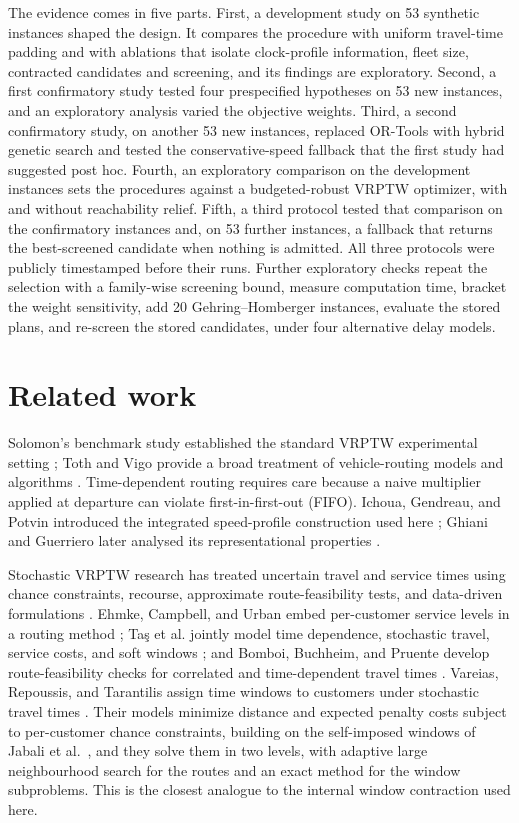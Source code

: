 \documentclass[11pt,a4paper]{article}
\begin{document}
The evidence comes in five parts. First, a development study on 53 synthetic instances
shaped the design. It compares the procedure with uniform travel-time padding and
with ablations that isolate clock-profile information, fleet size, contracted
candidates and screening, and its findings are exploratory. Second, a first confirmatory
study tested four prespecified hypotheses on 53 new instances, and an
exploratory analysis varied the objective weights. Third, a second confirmatory study,
on another 53 new instances, replaced OR-Tools with hybrid genetic search
\cite{vidal2022,wouda2024} and tested the conservative-speed fallback that the
first study had suggested post hoc. Fourth, an exploratory comparison on the
development instances sets the procedures against a budgeted-robust VRPTW
optimizer, with and without reachability relief. Fifth, a third protocol tested
that comparison on the confirmatory instances and, on 53 further instances, a
fallback that returns the best-screened candidate when nothing is admitted. All
three protocols were publicly timestamped before their runs. Further exploratory
checks repeat the selection with a family-wise screening bound, measure
computation time, bracket the weight sensitivity, add 20 Gehring--Homberger
instances, evaluate the stored plans, and re-screen the stored candidates,
under four alternative delay models.

\section{Related work}

Solomon's benchmark study established the standard VRPTW experimental setting
\cite{solomon1987}; Toth and Vigo provide a broad treatment of vehicle-routing
models and algorithms \cite{toth2014}. Time-dependent routing requires care
because a naive multiplier applied at departure can violate first-in-first-out
(FIFO). Ichoua, Gendreau, and Potvin introduced the integrated speed-profile
construction used here \cite{ichoua2003}; Ghiani and Guerriero later analysed
its representational properties \cite{ghiani2014}.

Stochastic VRPTW research has treated uncertain travel and service times using
chance constraints, recourse, approximate route-feasibility tests, and
data-driven formulations \cite{laporte1992,kenyon2003,li2010,errico2018,bomboi2022,serrano2026}.
Ehmke, Campbell, and Urban embed per-customer service levels in a routing
method \cite{ehmke2015}; Ta\c{s} et al. jointly model time dependence,
stochastic travel, service costs, and soft windows \cite{tas2014}; and Bomboi,
Buchheim, and Pruente develop route-feasibility checks for correlated and
time-dependent travel times \cite{bomboi2022}. Vareias, Repoussis, and
Tarantilis assign time windows to customers under stochastic travel times
\cite{vareias2019}. Their models minimize distance and expected penalty costs
subject to per-customer chance constraints, building on the self-imposed
windows of Jabali et al.\ \cite{jabali2015}, and they solve them in two levels,
with adaptive large neighbourhood search for the routes and an exact method for
the window subproblems. This is the closest analogue to the internal window
contraction used here.
\end{document}
